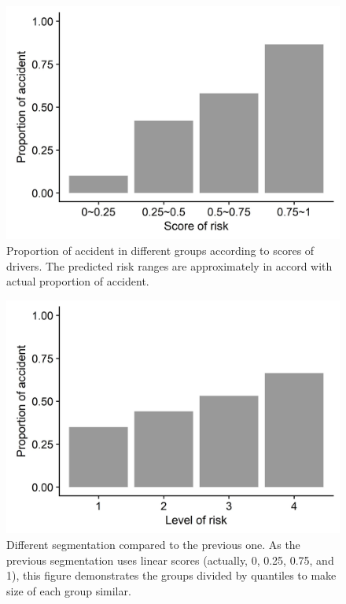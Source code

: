 \documentclass[sii]{ipart}
\theoremstyle{plain}
\begin{document}
\begin{figure}[h]
	\centering
	\includegraphics[width=0.99\linewidth]{pred_group}
	\small\caption[]{Proportion of accident in different groups according to scores of drivers. The predicted risk ranges are approximately in accord with actual proportion of accident.}
	\label{fig:pred_group}
\end{figure}

\begin{figure}[h!]
	\centering
	\includegraphics[width=1\linewidth]{pred_group_q}
	\small\caption[]{Different segmentation compared to the previous one. As the previous segmentation uses linear scores (actually, 0, 0.25, 0.75, and 1), this figure demonstrates the groups divided by quantiles to make size of each group similar.}
	\label{fig:pred_group_q}
\end{figure}
\end{document}
